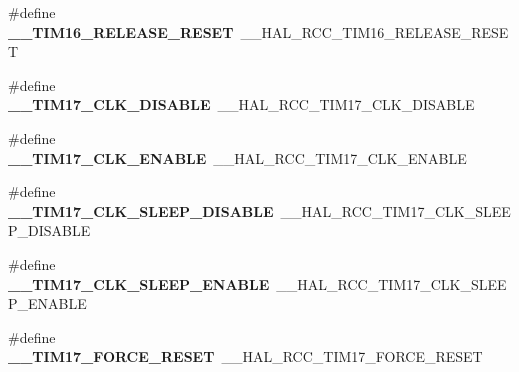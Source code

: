 \begin{DoxyCompactItemize}
\item 
\mbox{\label{group___h_a_l___r_c_c___aliased_gabc91257ee41523107cae6d7f3413750b}} 
\#define {\bfseries \+\_\+\+\_\+\+T\+I\+M16\+\_\+\+R\+E\+L\+E\+A\+S\+E\+\_\+\+R\+E\+S\+ET}~\+\_\+\+\_\+\+H\+A\+L\+\_\+\+R\+C\+C\+\_\+\+T\+I\+M16\+\_\+\+R\+E\+L\+E\+A\+S\+E\+\_\+\+R\+E\+S\+ET
\item 
\mbox{\label{group___h_a_l___r_c_c___aliased_ga221f536db3bd69c4a9617067509cc328}} 
\#define {\bfseries \+\_\+\+\_\+\+T\+I\+M17\+\_\+\+C\+L\+K\+\_\+\+D\+I\+S\+A\+B\+LE}~\+\_\+\+\_\+\+H\+A\+L\+\_\+\+R\+C\+C\+\_\+\+T\+I\+M17\+\_\+\+C\+L\+K\+\_\+\+D\+I\+S\+A\+B\+LE
\item 
\mbox{\label{group___h_a_l___r_c_c___aliased_ga0208b98e98d5baeb46f39c7ed5ae3351}} 
\#define {\bfseries \+\_\+\+\_\+\+T\+I\+M17\+\_\+\+C\+L\+K\+\_\+\+E\+N\+A\+B\+LE}~\+\_\+\+\_\+\+H\+A\+L\+\_\+\+R\+C\+C\+\_\+\+T\+I\+M17\+\_\+\+C\+L\+K\+\_\+\+E\+N\+A\+B\+LE
\item 
\mbox{\label{group___h_a_l___r_c_c___aliased_gacad0cfe779960cb0b9444620e6ee7997}} 
\#define {\bfseries \+\_\+\+\_\+\+T\+I\+M17\+\_\+\+C\+L\+K\+\_\+\+S\+L\+E\+E\+P\+\_\+\+D\+I\+S\+A\+B\+LE}~\+\_\+\+\_\+\+H\+A\+L\+\_\+\+R\+C\+C\+\_\+\+T\+I\+M17\+\_\+\+C\+L\+K\+\_\+\+S\+L\+E\+E\+P\+\_\+\+D\+I\+S\+A\+B\+LE
\item 
\mbox{\label{group___h_a_l___r_c_c___aliased_ga7a2dbc1a3fd9cc044f437f3b3760138f}} 
\#define {\bfseries \+\_\+\+\_\+\+T\+I\+M17\+\_\+\+C\+L\+K\+\_\+\+S\+L\+E\+E\+P\+\_\+\+E\+N\+A\+B\+LE}~\+\_\+\+\_\+\+H\+A\+L\+\_\+\+R\+C\+C\+\_\+\+T\+I\+M17\+\_\+\+C\+L\+K\+\_\+\+S\+L\+E\+E\+P\+\_\+\+E\+N\+A\+B\+LE
\item 
\mbox{\label{group___h_a_l___r_c_c___aliased_ga86bf9b6f86bc9071e215bc664c8e0923}} 
\#define {\bfseries \+\_\+\+\_\+\+T\+I\+M17\+\_\+\+F\+O\+R\+C\+E\+\_\+\+R\+E\+S\+ET}~\+\_\+\+\_\+\+H\+A\+L\+\_\+\+R\+C\+C\+\_\+\+T\+I\+M17\+\_\+\+F\+O\+R\+C\+E\+\_\+\+R\+E\+S\+ET
\item 
\mbox{\label{group___h_a_l___r_c_c___aliased_gab8e7ecf7c59c1db06b2ba69bd7527e3f}} 

\end{DoxyCompactItemize}
